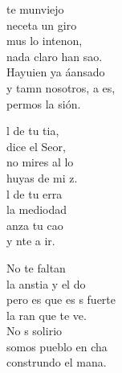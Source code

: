 \begin{cancion}%
	te munviejo\\
	neceta un giro  \\
	mus lo intenon,\\
	nada claro han sao.\\
	Hayuien ya áansado\\
	y tamn nosotros, a es,\\
	permos la sión.\jump\\
	\begin{chorus}%
		l de tu tia,\\
		 dice el Seor,\\
		no mires al lo\\
		 huyas de mi z.\\
		l de tu erra\\
		la mediodad\\
		anza tu cao\\
		y nte a ir.\jump\\
	\end{chorus}%
	No te faltan\\
	la anstia y el do\\
	pero es que es s fuerte\\
	la ran que te ve.\\
	No s solirio\\
	somos pueblo en cha\\
	construndo el mana.\\
\end{cancion}%
